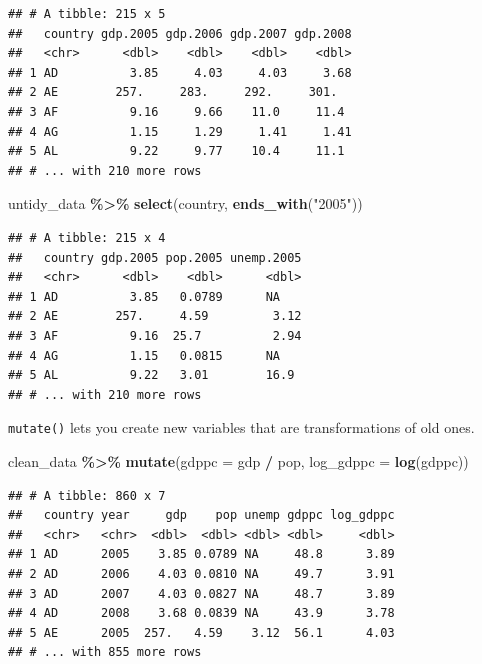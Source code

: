 \documentclass[
  12pt,
  oneside,openany]{book}
\newenvironment{Shaded}{\begin{snugshade}}{\end{snugshade}}
\newcommand{\DataTypeTok}[1]{\textcolor[rgb]{0.13,0.29,0.53}{#1}}
\newcommand{\KeywordTok}[1]{\textcolor[rgb]{0.13,0.29,0.53}{\textbf{#1}}}
\newcommand{\NormalTok}[1]{#1}
\newcommand{\OperatorTok}[1]{\textcolor[rgb]{0.81,0.36,0.00}{\textbf{#1}}}
\newcommand{\StringTok}[1]{\textcolor[rgb]{0.31,0.60,0.02}{#1}}
\begin{document}
\begin{verbatim}
## # A tibble: 215 x 5
##   country gdp.2005 gdp.2006 gdp.2007 gdp.2008
##   <chr>      <dbl>    <dbl>    <dbl>    <dbl>
## 1 AD          3.85     4.03     4.03     3.68
## 2 AE        257.     283.     292.     301.  
## 3 AF          9.16     9.66    11.0     11.4 
## 4 AG          1.15     1.29     1.41     1.41
## 5 AL          9.22     9.77    10.4     11.1 
## # ... with 210 more rows
\end{verbatim}

\begin{Shaded}
\begin{Highlighting}[]
\NormalTok{untidy\_data }\OperatorTok{\%\textgreater{}\%}
\StringTok{  }\KeywordTok{select}\NormalTok{(country, }\KeywordTok{ends\_with}\NormalTok{(}\StringTok{"2005"}\NormalTok{))}
\end{Highlighting}
\end{Shaded}

\begin{verbatim}
## # A tibble: 215 x 4
##   country gdp.2005 pop.2005 unemp.2005
##   <chr>      <dbl>    <dbl>      <dbl>
## 1 AD          3.85   0.0789      NA   
## 2 AE        257.     4.59         3.12
## 3 AF          9.16  25.7          2.94
## 4 AG          1.15   0.0815      NA   
## 5 AL          9.22   3.01        16.9 
## # ... with 210 more rows
\end{verbatim}

\texttt{mutate()} lets you create new variables that are transformations of old ones.

\begin{Shaded}
\begin{Highlighting}[]
\NormalTok{clean\_data }\OperatorTok{\%\textgreater{}\%}
\StringTok{  }\KeywordTok{mutate}\NormalTok{(}\DataTypeTok{gdppc =}\NormalTok{ gdp }\OperatorTok{/}\StringTok{ }\NormalTok{pop,}
         \DataTypeTok{log\_gdppc =} \KeywordTok{log}\NormalTok{(gdppc))}
\end{Highlighting}
\end{Shaded}

\begin{verbatim}
## # A tibble: 860 x 7
##   country year     gdp    pop unemp gdppc log_gdppc
##   <chr>   <chr>  <dbl>  <dbl> <dbl> <dbl>     <dbl>
## 1 AD      2005    3.85 0.0789 NA     48.8      3.89
## 2 AD      2006    4.03 0.0810 NA     49.7      3.91
## 3 AD      2007    4.03 0.0827 NA     48.7      3.89
## 4 AD      2008    3.68 0.0839 NA     43.9      3.78
## 5 AE      2005  257.   4.59    3.12  56.1      4.03
## # ... with 855 more rows
\end{verbatim}
\end{document}
